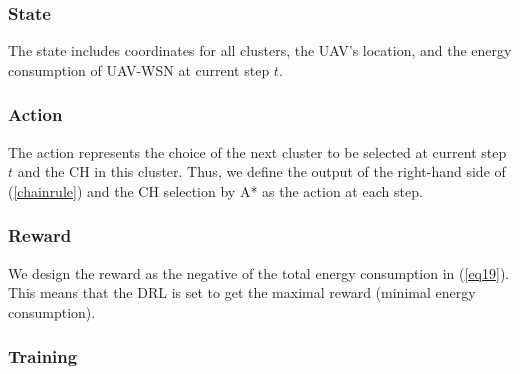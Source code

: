 \documentclass[journal]{IEEEtran}
\begin{document}
	 \subsubsection{State}
	 The state includes coordinates for all clusters,  the UAV's location, and the energy consumption of UAV-WSN at current step $t$.
	 \subsubsection{Action} The action represents the choice of the next cluster to be selected at current step $t$ and the CH in this cluster. Thus, we define the output of the right-hand side of (\ref{chainrule}) and the CH selection by A* as the action at each step.
	 \subsubsection{Reward} We design the reward as the negative of the total energy consumption in (\ref{eq19}). This means that the DRL is set to get the maximal reward (minimal energy consumption).
	
	
	
	
	 \subsubsection{Training}
	
\end{document}
